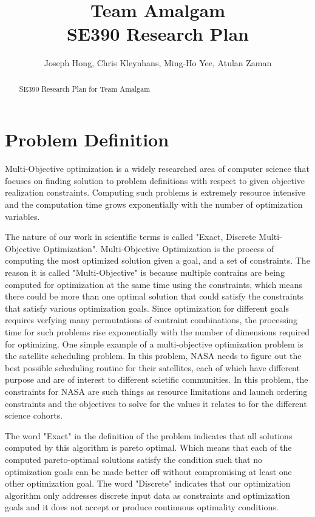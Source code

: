 \documentclass[11pt]{article}
\title{Team Amalgam \\ SE390 Research Plan}
\author{Joseph Hong, Chris Kleynhans, Ming-Ho Yee, Atulan Zaman}
\begin{document}
\maketitle

\begin{abstract}

SE390 Research Plan for Team Amalgam

\end{abstract}

\tableofcontents
\newpage

\section{Problem Definition}
Multi-Objective optimization is a widely researched area of computer science that focuses on finding solution to problem definitions with respect to given objective realization constraints. Computing such problems is extremely resource intensive and the computation time grows exponentially with the number of optimization variables.

The nature of our work in scientific terms is called "Exact, Discrete Multi-Objective Optimization". Multi-Objective Optimization is the process of computing the most optimized solution given a goal, and a set of constraints. The reason it is called "Multi-Objective" is because multiple contrains are being computed for optimization at the same time using the constraints, which means there could be more than one optimal solution that could satisfy the constraints that satisfy various optimization goals. Since optimization for different goals requires verfying many permutations of contraint combinations, the processing time for such problems rise exponentially with the number of dimensions required for optimizing. One simple example of a multi-objective optimization problem is the satellite scheduling problem. In this problem, \cite{} NASA needs to figure out the best possible scheduling routine for their satellites, each of which have different purpose and are of interest to different scietific communities. In this problem, the constraints for NASA are such things as resource limitations and launch ordering constraints and the objectives to solve for the values it relates to for the different science cohorts.

The word "Exact" in the definition of the problem indicates that all solutions computed by this algorithm is pareto optimal. Which means that each of the computed pareto-optimal solutions satisfy the condition such that no optimization goals can be made better off without compromising at least one other optimization goal. The word "Discrete" indicates that our optimization algorithm only addresses discrete input data as constraints and optimization goals and it does not accept or produce continuous optimality conditions.
\end{document}

